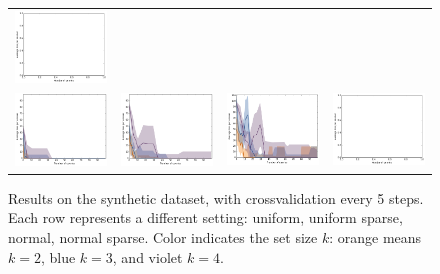 \documentclass{article}
\renewcommand\[{\begin{equation}}
\renewcommand\]{\end{equation}}
\begin{document}
\begin{figure}[b]
\begin{tabular}{cccc}
        \includegraphics[width=12em]{figures/synthetic_6_normal_cv5_loss}
        \\
        \includegraphics[width=12em]{figures/synthetic_3_normal_sparse_cv5_loss} &
        \includegraphics[width=12em]{figures/synthetic_4_normal_sparse_cv5_loss} &
        \includegraphics[width=12em]{figures/synthetic_5_normal_sparse_cv5_loss} &
        \includegraphics[width=12em]{figures/synthetic_6_normal_sparse_cv5_loss}
    \end{tabular}
    \caption{Results on the synthetic dataset, with crossvalidation every 5 steps. Each row represents a different
    setting: uniform, uniform sparse, normal, normal sparse. Color indicates
    the set size $k$: orange means $k=2$, blue $k=3$, and violet $k=4$.}
\end{figure}
\end{document}
